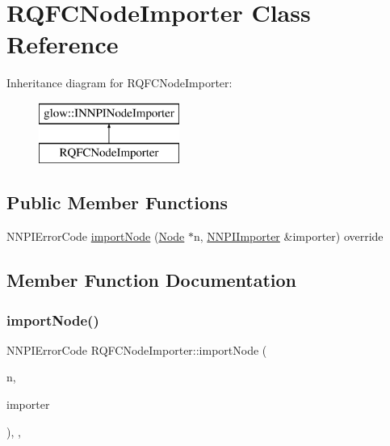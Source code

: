 \hypertarget{class_r_q_f_c_node_importer}{}\section{R\+Q\+F\+C\+Node\+Importer Class Reference}
\label{class_r_q_f_c_node_importer}
Inheritance diagram for R\+Q\+F\+C\+Node\+Importer\+:\begin{figure}[H]
\begin{center}
\leavevmode
\includegraphics[height=2.000000cm]{class_r_q_f_c_node_importer}
\end{center}
\end{figure}
\subsection*{Public Member Functions}
\begin{DoxyCompactItemize}
\item 
N\+N\+P\+I\+Error\+Code \hyperlink{class_r_q_f_c_node_importer_a41e08f9a5cbbd9b7039239b6f9587bc0}{import\+Node} (\hyperlink{classglow_1_1_node}{Node} $\ast$n, \hyperlink{classglow_1_1_n_n_p_i_importer}{N\+N\+P\+I\+Importer} \&importer) override
\end{DoxyCompactItemize}


\subsection{Member Function Documentation}
\mbox{\label{class_r_q_f_c_node_importer_a41e08f9a5cbbd9b7039239b6f9587bc0}} 
\subsubsection{\texorpdfstring{import\+Node()}{importNode()}}
{\footnotesize\ttfamily N\+N\+P\+I\+Error\+Code R\+Q\+F\+C\+Node\+Importer\+::import\+Node (\begin{DoxyParamCaption}\item[{\hyperlink{classglow_1_1_node}{Node} $\ast$}]{n,  }\item[{\hyperlink{classglow_1_1_n_n_p_i_importer}{N\+N\+P\+I\+Importer} \&}]{importer }\end{DoxyParamCaption})\hspace{0.3cm}{\ttfamily [inline]}, {\ttfamily [override]}, {\ttfamily [virtual]}}

